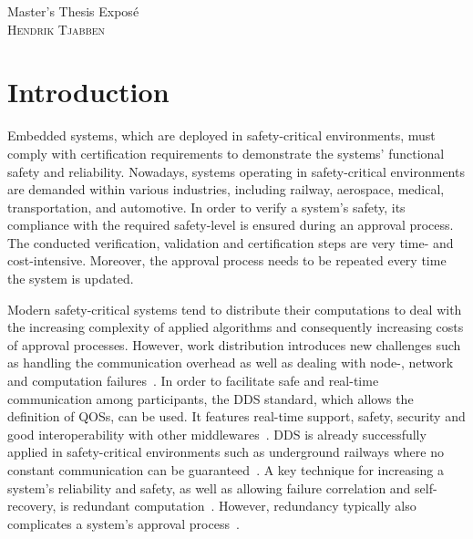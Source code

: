 \documentclass[a4paper, 12pt]{scrartcl}
\begin{document}
\begin{center}
  \Huge{Master's Thesis Expos\'{e}}\\
  \large{\textsc{Hendrik Tjabben}}
\end{center}


\section*{Introduction}
Embedded systems, which are deployed in safety-critical environments, must comply with certification requirements to demonstrate the systems' functional safety and reliability.
Nowadays, systems operating in safety-critical environments are demanded within various industries, including railway, aerospace, medical, transportation, and automotive.
In order to verify a system's safety, its compliance with the required safety-level is ensured during an approval process.
The conducted verification, validation and certification steps are very time- and cost-intensive.
Moreover, the approval process needs to be repeated every time the system is updated.

Modern safety-critical systems tend to distribute their computations to deal with the increasing complexity of applied algorithms and consequently increasing costs of approval processes.
However, work distribution introduces new challenges such as handling the communication overhead as well as dealing with node-, network and computation failures~\cite{DistributedSafety2020}.
In order to facilitate safe and real-time communication among participants, the \gls*{DDS} standard, which allows the definition of \glspl*{QOS}, can be used.
It features real-time support, safety, security and good interoperability with other middlewares~\cite{DistributedSafety2020}.
\gls*{DDS} is already successfully applied in safety-critical environments such as underground railways where no constant communication can be guaranteed~\cite{DDSInURail}.
A key technique for increasing a system's reliability and safety, as well as allowing failure correlation and self-recovery, is redundant computation~\cite{TanenbaumSteen07}.
However, redundancy typically also complicates a system's approval process~\cite{ReliabilityThroughRedundancy}.

\end{document}
